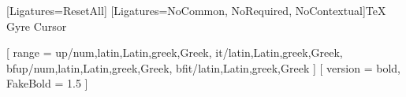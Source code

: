 
\newif\ifusenotoserif
\newif\ifusenotosans
\newif\ifusenotomono

\newif\ifusenotonaskharabic
\newif\ifusenotosansarabic


\ifenabledbidi
    \ifinswedish
        \usepackage[english, main=swedish, provide+=*, bidi=basic]{babel}
    \else
        \usepackage[swedish, main=english, provide+=*, bidi=basic]{babel}
    \fi
\else
    \ifinswedish
        \usepackage[english, main=swedish, provide+=*]{babel}
    \else
        \usepackage[swedish, main=english, provide+=*]{babel}
    \fi
\fi


\setmonofont{TeX Gyre Cursor}[Ligatures={ResetAll}]
[Ligatures={NoCommon, NoRequired, NoContextual}]{TeX Gyre Cursor}

\makeatletter

\usepackage{mathtools}
\usepackage[
  math-style=ISO,
  bold-style=ISO
]{unicode-math}

[
  range = {
    up/{num,latin,Latin,greek,Greek},
    it/{latin,Latin,greek,Greek},
    bfup/{num,latin,Latin,greek,Greek},
    bfit/{latin,Latin,greek,Greek}
  }
]
[
  version = bold,
  FakeBold = 1.5
]

